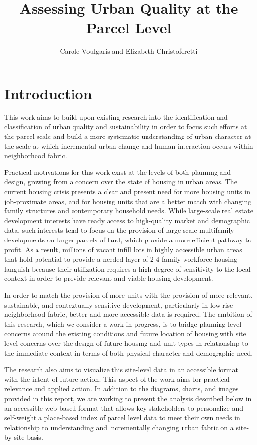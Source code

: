 \documentclass[
]{book}
\title{Assessing Urban Quality at the Parcel Level}
\author{Carole Voulgaris and Elizabeth Christoforetti}
\date{}
\begin{document}
\maketitle

{
\setcounter{tocdepth}{1}
\tableofcontents
}
\hypertarget{introduction}{%
\chapter{Introduction}\label{introduction}}

This work aims to build upon existing research into the identification and classification of urban quality and sustainability in order to focus such efforts at the parcel scale and build a more systematic understanding of urban character at the scale at which incremental urban change and human interaction occurs within neighborhood fabric.

Practical motivations for this work exist at the levels of both planning and design, growing from a concern over the state of housing in urban areas. The current housing crisis presents a clear and present need for more housing units in job-proximate areas, and for housing units that are a better match with changing family structures and contemporary household needs. While large-scale real estate development interests have ready access to high-quality market and demographic data, such interests tend to focus on the provision of large-scale multifamily developments on larger parcels of land, which provide a more efficient pathway to profit. As a result, millions of vacant infill lots in highly accessible urban areas that hold potential to provide a needed layer of 2-4 family workforce housing languish because their utilization requires a high degree of sensitivity to the local context in order to provide relevant and viable housing development.

In order to match the provision of more units with the provision of more relevant, sustainable, and contextually sensitive development, particularly in low-rise neighborhood fabric, better and more accessible data is required. The ambition of this research, which we consider a work in progress, is to bridge planning level concerns around the existing conditions and future location of housing with site level concerns over the design of future housing and unit types in relationship to the immediate context in terms of both physical character and demographic need.

The research also aims to visualize this site-level data in an accessible format with the intent of future action. This aspect of the work aims for practical relevance and applied action. In addition to the diagrams, charts, and images provided in this report, we are working to present the analysis described below in an accessible web-based format that allows key stakeholders to personalize and self-weight a place-based index of parcel level data to meet their own needs in relationship to understanding and incrementally changing urban fabric on a site-by-site basis.
\end{document}
